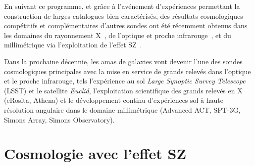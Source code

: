 En suivant ce programme, et
grâce à l'avénement d'expériences permettant la construction de larges
catalogues bien caractérisés, des résultats cosmologiques compétitifs
et complémentaires d'autres sondes ont été récemment obtenus dans les
domaines du rayonnement X~\citep{Vikhlinin2009, Bohringer2014, Mantz2015, Marulli2018,
  Pacaud2018}, de l'optique et proche infrarouge~\citep{Rozo2010,
  Mana2013, Costanzi2019}, et du millimétrique via l'exploitation de
l'effet SZ~\citep{Hasselfield2013_ACT_SZ, Planck2016_ymap,
  Planck_2016_SZ_cosmo, Bolliet2018, Bolliet2019, deHaan2016,
  Bocquet2019, Salvati2018, Zulbedia2019}.

Dans la prochaine décennie, les amas de galaxies vont devenir l'une
des sondes cosmologiques principales avec la mise en service de grands
relevés dans l'optique et le proche infrarouge, tels l'expérience au
sol \emph{Large Synoptic Survey Telescope} (LSST) et le satellite
\emph{Euclid}, l'exploitation scientifique des grands relevés en X
(eRosita, Athena) et le développement continu d'expériences sol à
haute résolution angulaire dans le domaine millimétrique (Advanced
ACT, SPT-3G, Simons Array, Simons Observatory). 


\section{Cosmologie avec l'effet SZ}
\label{se:cosmo_sz}

